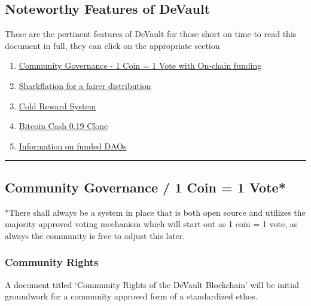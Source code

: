 \hypertarget{h.844cfd63jvaa}{%
\subsection{\texorpdfstring{{Noteworthy Features of
DeVault}}{Noteworthy Features of DeVault}}\label{h.844cfd63jvaa}}

{These are the pertinent features of DeVault for those short on time to
read this document in full, they can click on the appropriate section}

{}

\begin{enumerate}
\tightlist
\item
  {\protect\hyperlink{h.c0d8fzly70q7}{Community Governance - 1 Coin = 1
  Vote with On-chain funding}}
\item
  {\protect\hyperlink{h.7imft9llrxlk}{Sharkflation for a fairer
  distribution}}
\item
  {\protect\hyperlink{h.xc6vji4r4g6e}{Cold Reward System}}
\item
  {\protect\hyperlink{h.h4zmjemhgqxi}{Bitcoin Cash 0.19 Clone}}
\item
  {\protect\hyperlink{h.93av7wuny8ba}{Information on funded DAOs}}
\end{enumerate}

{}

\begin{center}\rule{0.5\linewidth}{\linethickness}\end{center}

{}

\hypertarget{h.c0d8fzly70q7}{%
\subsection{\texorpdfstring{{Community Governance / 1 Coin = 1
Vote*}}{Community Governance / 1 Coin = 1 Vote*}}\label{h.c0d8fzly70q7}}

{*There shall always be a system in place that is both open source and
utilizes the majority approved voting mechanism which will start out as
1 coin = 1 vote, as always the community is free to adjust this later.}

\hypertarget{h.parxytnbp8ej}{%
\subsubsection{\texorpdfstring{{Community
Rights}}{Community Rights}}\label{h.parxytnbp8ej}}

{A document titled `Community Rights of the DeVault Blockchain' will be
initial groundwork for a community approved form of a standardized
ethos. }

